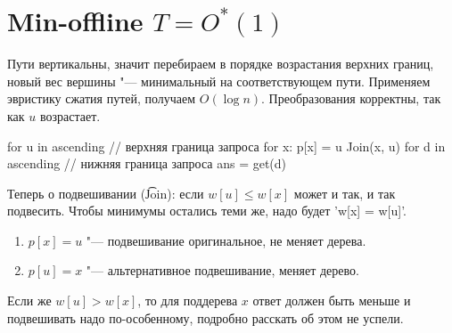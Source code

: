 \section{Min-offline \texorpdfstring{$T =  O^*(1)$}{T = O*(1)}}


Пути вертикальны, значит перебираем в порядке возрастания верхних границ, новый вес вершины "--- минимальный на соответствующем пути.
Применяем эвристику сжатия путей, получаем $O(\log n)$.
Преобразования корректны, так как $u$ возрастает.

\begin{cppcode}
for u in ascending // верхняя граница запроса
	for x: p[x] = u
		Join(x, u)
	for d in ascending // нижняя граница запроса
		ans = get(d)
\end{cppcode}

Теперь о подвешивании (\t{Join}): если $w[u] \le w[x]$ может и так, и так подвесить.
Чтобы минимумы остались теми же, надо будет \cpp'w[x] = w[u]'.

\begin{enumerate}
	\item $p[x] = u$ "--- подвешивание оригинальное, не меняет дерева.
	\item $p[u] = x$ "--- альтернативное подвешивание, меняет дерево.
\end{enumerate}

Если же $w[u] > w[x]$, то для поддерева $x$ ответ должен быть меньше и подвешивать надо по-особенному, подробно расскать об этом не успели.

